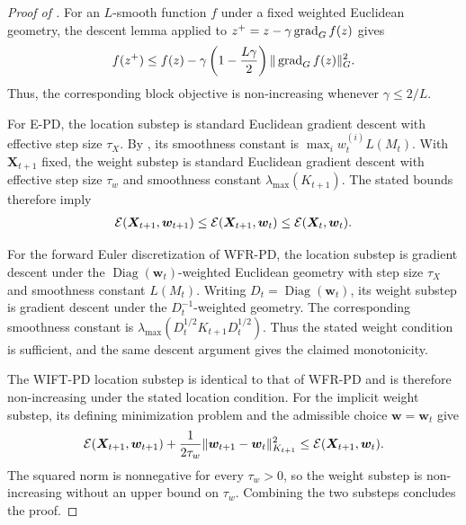 \begin{proof}[Proof of ]
For an $L$-smooth function $f$ under a fixed weighted Euclidean geometry, the descent lemma applied to $z^+=z-\gamma\operatorname{grad}_G f(z)$ gives
\begin{align*}
f(z^+)\leq f(z)-\gamma\left(1-\frac{L\gamma}{2}\right)\|\operatorname{grad}_G f(z)\|_G^2.
\end{align*}
Thus, the corresponding block objective is non-increasing whenever $\gamma\leq2/L$.

For E-PD, the location substep is standard Euclidean gradient descent with effective step size $\tau_X$. By , its smoothness constant is $\max_i w_t^{(i)}L(M_t)$. With $\bm{X}_{t+1}$ fixed, the weight substep is standard Euclidean gradient descent with effective step size $\tau_w$ and smoothness constant $\lambda_{\max}(K_{t+1})$. The stated bounds therefore imply
\begin{align*}
\mathcal{E}(\bm{X}_{t+1},\bm{w}_{t+1})\leq\mathcal{E}(\bm{X}_{t+1},\bm{w}_t)\leq\mathcal{E}(\bm{X}_t,\bm{w}_t).
\end{align*}

For the forward Euler discretization of WFR-PD, the location substep is gradient descent under the $\operatorname{Diag}(\bm{w}_t)$-weighted Euclidean geometry with step size $\tau_X$ and smoothness constant $L(M_t)$. Writing $D_t=\operatorname{Diag}(\bm{w}_t)$, its weight substep is gradient descent under the $D_t^{-1}$-weighted geometry. The corresponding smoothness constant is $\lambda_{\max}(D_t^{1/2}K_{t+1}D_t^{1/2})$. Thus the stated weight condition is sufficient, and the same descent argument gives the claimed monotonicity.

The WIFT-PD location substep is identical to that of WFR-PD and is therefore non-increasing under the stated location condition. For the implicit weight substep, its defining minimization problem and the admissible choice $\bm{w}=\bm{w}_t$ give
\begin{align*}
\mathcal{E}(\bm{X}_{t+1},\bm{w}_{t+1})
+\frac{1}{2\tau_w}\|\bm{w}_{t+1}-\bm{w}_t\|_{K_{t+1}}^2
\leq\mathcal{E}(\bm{X}_{t+1},\bm{w}_t).
\end{align*}
The squared norm is nonnegative for every $\tau_w>0$, so the weight substep is non-increasing without an upper bound on $\tau_w$. Combining the two substeps concludes the proof.
\end{proof}

